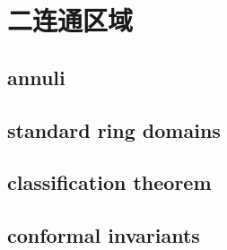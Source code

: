 \section{二连通区域}
\label{b3:sec:0801}


\subsection{annuli}
\label{b3:subsec:080101}

\subsection{standard ring domains}
\label{b3:subsec:080102}

\subsection{classification theorem}
\label{b3:subsec:080103}

\subsection{conformal invariants}
\label{b3:subsec:080104}


